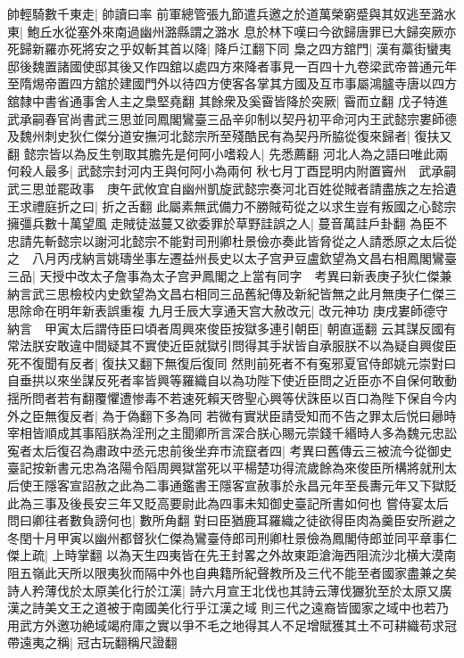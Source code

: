帥輕騎數千東走|{
	帥讀曰率}
前軍總管張九節遣兵邀之於道萬榮窮蹙與其奴逃至潞水東|{
	鮑丘水從塞外來南過幽州潞縣謂之潞水}
息於林下嘆曰今欲歸唐罪已大歸突厥亦死歸新羅亦死將安之乎奴斬其首以降|{
	降戶江翻下同}
梟之四方舘門|{
	漢有藁街蠻夷邸後魏置諸國使邸其後又作四舘以處四方來降者事見一百四十九卷梁武帝普通元年至隋焬帝置四方舘於建國門外以待四方使客各掌其方國及互市事屬鴻臚寺唐以四方舘隸中書省通事舍人主之梟堅堯翻}
其餘衆及奚霫皆降於突厥|{
	霫而立翻}
戊子特進武承嗣春官尚書武三思並同鳳閣鸞臺三品辛卯制以契丹初平命河内王武懿宗婁師德及魏州刺史狄仁傑分道安撫河北懿宗所至殘酷民有為契丹所脇從復來歸者|{
	復扶又翻}
懿宗皆以為反生刳取其膽先是何阿小嗜殺人|{
	先悉薦翻}
河北人為之語曰唯此兩何殺人最多|{
	武懿宗封河内王與何阿小為兩何}
秋七月丁酉昆明内附置竇州　武承嗣武三思並罷政事　庚午武攸宜自幽州凱旋武懿宗奏河北百姓從賊者請盡族之左拾遺王求禮庭折之曰|{
	折之舌翻}
此屬素無武備力不勝賊苟從之以求生豈有叛國之心懿宗擁彊兵數十萬望風走賊徒滋蔓又欲委罪於草野詿誤之人|{
	蔓音萬詿戶卦翻}
為臣不忠請先斬懿宗以謝河北懿宗不能對司刑卿杜景儉亦奏此皆脅從之人請悉原之太后從之　八月丙戌納言姚璹坐事左遷益州長史以太子宫尹豆盧欽望為文昌右相鳳閣鸞臺三品|{
	天授中改太子詹事為太子宫尹鳳閣之上當有同字　考異曰新表庚子狄仁傑兼納言武三思檢校内史欽望為文昌右相同三品舊紀傳及新紀皆無之此月無庚子仁傑三思除命在明年新表誤重複}
九月壬辰大享通天宫大赦改元|{
	改元神功}
庚戌婁師德守納言　甲寅太后謂侍臣曰頃者周興來俊臣按獄多連引朝臣|{
	朝直遥翻}
云其謀反國有常法朕安敢違中間疑其不實使近臣就獄引問得其手狀皆自承服朕不以為疑自興俊臣死不復聞有反者|{
	復扶又翻下無復后復同}
然則前死者不有寃邪夏官侍郎姚元崇對曰自垂拱以來坐謀反死者率皆興等羅織自以為功陛下使近臣問之近臣亦不自保何敢動揺所問者若有翻覆懼遭惨毒不若速死賴天啓聖心興等伏誅臣以百口為陛下保自今内外之臣無復反者|{
	為于偽翻下多為同}
若微有實狀臣請受知而不告之罪太后悦曰曏時宰相皆順成其事䧟朕為淫刑之主聞卿所言深合朕心賜元崇錢千緡時人多為魏元忠訟寃者太后復召為肅政中丞元忠前後坐弃市流竄者四|{
	考異曰舊傳云三被流今從御史臺記按新書元忠為洛陽令䧟周興獄當死以平楊楚功得流歲餘為來俊臣所構將就刑太后使王隱客宣詔赦之此為二事通鑑書王隱客宣赦事於永昌元年至長夀元年又下獄貶此為三事及後長安三年又貶高要尉此為四事未知御史臺記所書如何也}
嘗侍宴太后問曰卿往者數負謗何也|{
	數所角翻}
對曰臣猶鹿耳羅織之徒欲得臣肉為羹臣安所避之　冬閏十月甲寅以幽州都督狄仁傑為鸞臺侍郎司刑卿杜景儉為鳳閣侍郎並同平章事仁傑上疏|{
	上時掌翻}
以為天生四夷皆在先王封畧之外故東距滄海西阻流沙北横大漠南阻五嶺此天所以限夷狄而隔中外也自典籍所紀聲教所及三代不能至者國家盡兼之矣詩人矜薄伐於太原美化行於江漢|{
	詩六月宣王北伐也其詩云薄伐玁狁至於太原又廣漢之詩美文王之道被于南國美化行乎江漢之域}
則三代之遠裔皆國家之域中也若乃用武方外邀功絶域竭府庫之實以爭不毛之地得其人不足增賦獲其土不可耕織苟求冠帶遠夷之稱|{
	冠古玩翻稱尺證翻}

